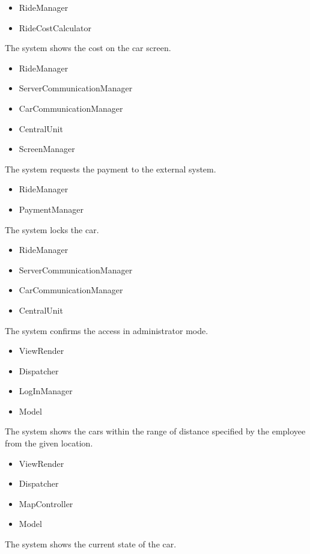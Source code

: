 \documentclass[11pt,a4paper]{report}
\begin{document}
\begin{Req}
			\begin{itemize}
				\item RideManager
				\item RideCostCalculator
			\end{itemize}
		\item The system shows the cost on the car screen.
			\begin{itemize}
				\item RideManager
				\item ServerCommunicationManager
				\item CarCommunicationManager
				\item CentralUnit
				\item ScreenManager 
			\end{itemize}
		\item The system requests the payment to the external system.
			\begin{itemize}
				\item RideManager
				\item PaymentManager 
			\end{itemize}
		\item The system locks the car.
			\begin{itemize}
				\item RideManager
				\item ServerCommunicationManager
				\item CarCommunicationManager
				\item CentralUnit
			\end{itemize}
		\item The system confirms the access in administrator mode.
			\begin{itemize}
				\item ViewRender
				\item Dispatcher
				\item LogInManager
				\item Model
			\end{itemize}
		\item The system shows the cars within the range of distance specified by the employee from the given location.
			\begin{itemize}
				\item ViewRender
				\item Dispatcher
				\item MapController
				\item Model
			\end{itemize}
		\item The system shows the current state of the car.

\end{Req}
\end{document}
